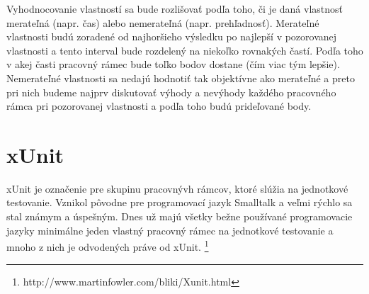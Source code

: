\documentclass[11pt,twoside,slovak,a4paper]{article}
\begin{document}
	Vyhodnocovanie vlastností sa bude rozlišovať podľa toho, či je daná vlastnosť merateľná (napr. čas) alebo nemerateľná (napr. prehľadnosť). 
	Merateľné vlastnosti budú zoradené od najhoršieho výsledku po najlepší v pozorovanej vlastnosti a tento interval bude rozdelený na niekoľko rovnakých častí. Podľa toho v akej časti pracovný rámec bude toľko bodov dostane (čím viac tým lepšie). 
	Nemerateľné vlastnosti sa nedajú hodnotiť tak objektívne ako merateľné a preto pri nich budeme najprv diskutovať výhody a nevýhody každého pracovného rámca pri pozorovanej vlastnosti a podľa toho budú prideľované body.
	
	\newpage
	\section{xUnit}
		xUnit je označenie pre skupinu pracovnývh rámcov, ktoré slúžia na jednotkové testovanie. Vznikol pôvodne pre programovací jazyk Smalltalk a veľmi rýchlo sa stal známym a úspešným. Dnes už majú všetky bežne používané programovacie jazyky minimálne jeden vlastný pracovný rámec na jednotkové testovanie a mnoho z nich je odvodených práve od xUnit. 		\footnote{http://www.martinfowler.com/bliki/Xunit.html} \newline
\end{document}

